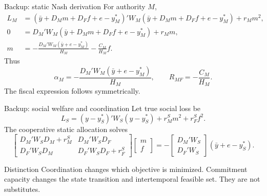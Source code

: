 \documentclass[10pt,aspectratio=169]{beamer}
\begin{document}
\begin{frame}{Backup: static Nash derivation}
For authority $M$,
\begin{align*}
L_M&=(\bar y+D_Mm+D_Ff+e-y_M^*)'W_M
     (\bar y+D_Mm+D_Ff+e-y_M^*)+r_Mm^2,\\
0&=D_M'W_M(\bar y+D_Mm+D_Ff+e-y_M^*)+r_Mm,\\
m&=-\frac{D_M'W_M(\bar y+e-y_M^*)}{H_M}
   -\frac{C_M}{H_M}f.
\end{align*}
Thus
\begin{equation*}
\alpha_M=-\frac{D_M'W_M(\bar y+e-y_M^*)}{H_M},
\qquad R_{MF}=-\frac{C_M}{H_M}.
\end{equation*}
The fiscal expression follows symmetrically.
\end{frame}

\begin{frame}{Backup: social welfare and coordination}
Let true social loss be
\begin{equation*}
L_S=(y-y_S^*)'W_S(y-y_S^*)+r_M^Sm^2+r_F^Sf^2.
\end{equation*}
The cooperative static allocation solves
\begin{equation*}
\begin{bmatrix}
D_M'W_SD_M+r_M^S&D_M'W_SD_F\\
D_F'W_SD_M&D_F'W_SD_F+r_F^S
\end{bmatrix}
\begin{bmatrix}m\\f\end{bmatrix}
=-
\begin{bmatrix}D_M'W_S\\D_F'W_S\end{bmatrix}
(\bar y+e-y_S^*).
\end{equation*}
\begin{alertblock}{Distinction}
Coordination changes which objective is minimized. Commitment capacity changes
the state transition and intertemporal feasible set. They are not substitutes.
\end{alertblock}
\end{frame}
\end{document}
